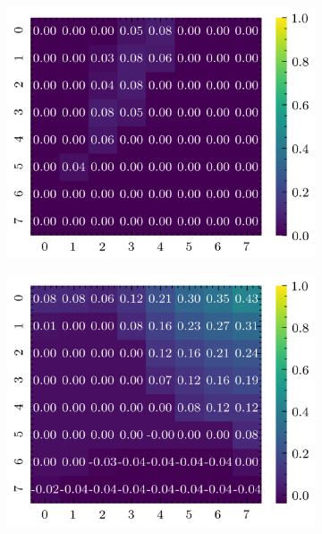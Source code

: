\begin{figure}[H]
    \begin{subfigure}[b]{0.19\textwidth}
        \includegraphics[width=\linewidth]{../img/5/quarry/false_positive/heatmap-2d-0.png}
    \end{subfigure}
    \begin{subfigure}[b]{0.19\textwidth}
        \includegraphics[width=\linewidth]{../img/5/quarry/false_positive/heatmap-2d-1.png}
    \end{subfigure}  
    \begin{subfigure}[b]{0.19\textwidth}

\end{subfigure}
\end{figure}
